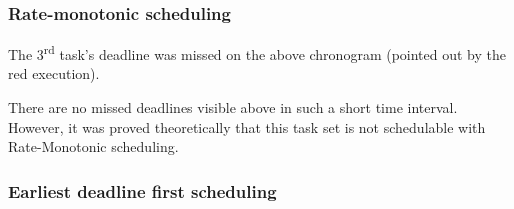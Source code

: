 \subsubsection{Rate-monotonic scheduling}

\begin{RTGrid}[width=10cm]{3}{20}







\end{RTGrid}

The 3\textsuperscript{rd} task's deadline was missed on the above chronogram (pointed out by the red execution). \\

\begin{RTGrid}[width=10cm]{3}{22}







\end{RTGrid}

There are no missed deadlines visible above in such a short time interval. However, it was proved theoretically that this task set is not schedulable with Rate-Monotonic scheduling.

\subsubsection{Earliest deadline first scheduling}

